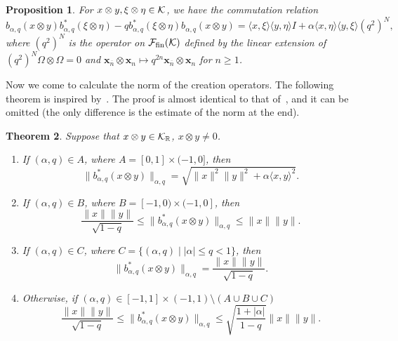 \documentclass[pdftex]{sigma}
\numberwithin{equation}{section}
\newtheorem{Theorem}{Theorem}[section]
\newtheorem{Proposition}[Theorem]{Proposition}
 { \theoremstyle{definition}
\newtheorem{Definition}[Theorem]{Definition}
\newtheorem{Note}[Theorem]{Note}
\newtheorem{Example}[Theorem]{Example}
\newtheorem{Remark}[Theorem]{Remark} }
\def\R{{\mathbb R}}
\def\B{b_{\s,\q}}
\def\F{\mathcal{F}_{\rm fin}(\HH)}
\def\id{I}
\def\HH{{\bf \mathcal K}}
\newcommand{\q}{q}
\newcommand{\s}{\alpha}%
\newcommand{\x}{\mathbf{x}_{\overline n} \otimes \mathbf{x}_n}
\begin{document}
\begin{Proposition}%
	For $x\otimes y,\xi\otimes \eta \in \HH$, we have the commutation relation
	\begin{equation*}
		\B(x\otimes y)\B^\ast(\xi\otimes \eta )- \q \B^\ast(\xi\otimes \eta )\B(x\otimes y)= \langle x,\xi \rangle\langle y,\eta \rangle \id +\s \langle x,\eta \rangle\langle y,\xi\rangle (\q^2)^{N},
	\end{equation*}
where $(\q^2)^{N}$ is the operator on $\F$ defined by the linear extension of $(\q^2)^{N}\Omega \otimes \Omega =0$ and
	$\x\mapsto q^{2n} \x$ for $n\geq 1$.
\end{Proposition}

Now we come to calculate the norm of the creation operators.
The following theorem is inspired by~\cite[Theorem~2.9]{BozejkoEjsmontHasebe2015}. The proof is almost identical
to that of~\cite[Theorem~2.9]{BozejkoEjsmontHasebe2015}, and it can be omitted (the only difference is the estimate of the norm
at the end).

\begin{Theorem} Suppose that $x\otimes y \in \HH_{\R}$, $x \otimes y \neq0$.
\begin{enumerate}\itemsep=0pt
\item[$1.$]%
If $(\s,\q)\in A $, where $A=[0 ,1]\times (-1,0]$, then
		\begin{equation*}%
			\|\B^\ast(x\otimes y)\|_{\s,\q}= \sqrt{\|x\|^2\|y\|^2 + \s \langle x,y\rangle^2}.
		\end{equation*}

		\item[$2.$]%
If $(\s,\q)\in B $, where $B= [-1 ,0)\times (-1,0]$, then
		\begin{equation*}%
			\frac{\|x\|\|y\|}{\sqrt{1-\q}}\leq \|\B^\ast(x\otimes y)\|_{\s,\q}\leq \|x\|\|y\|.
		\end{equation*}

		\item[$3.$]%
If $(\s,\q)\in C $, where $C= \{(\s,\q)\mid |\s| \leq \q <1\}$, then
	\[
		\|\B^\ast(x\otimes y)\|_{\s,\q}= \frac{\|x\|\|y\|}{\sqrt{1-\q}}.
	\]

		\item[$4.$]%
Otherwise, if $(\s,\q)\in [-1 ,1]\times (-1,1)\setminus (A\cup B\cup C) $
	\[
		\frac{\|x\|\|y\|}{\sqrt{1-\q}}\leq \|\B^\ast(x\otimes y)\|_{\s,\q}\leq \sqrt{\frac{1+|\s|}{1-\q}}\|x\|\|y\|.
	\]
	\end{enumerate}
\end{Theorem}
\end{document}
